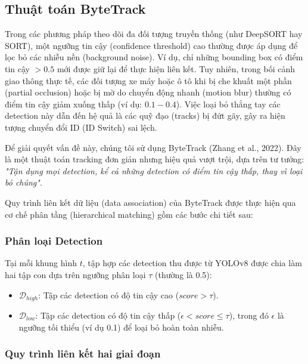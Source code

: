 \subsection{Thuật toán ByteTrack}
Trong các phương pháp theo dõi đa đối tượng truyền thống (như DeepSORT hay SORT), một ngưỡng tin cậy (confidence threshold) cao thường được áp dụng để lọc bỏ các nhiễu nền (background noise). Ví dụ, chỉ những bounding box có điểm tin cậy $> 0.5$ mới được giữ lại để thực hiện liên kết. Tuy nhiên, trong bối cảnh giao thông thực tế, các đối tượng xe máy hoặc ô tô khi bị che khuất một phần (partial occlusion) hoặc bị mờ do chuyển động nhanh (motion blur) thường có điểm tin cậy giảm xuống thấp (ví dụ: $0.1 - 0.4$). Việc loại bỏ thẳng tay các detection này dẫn đến hệ quả là các quỹ đạo (tracks) bị đứt gãy, gây ra hiện tượng chuyển đổi ID (ID Switch) sai lệch.

Để giải quyết vấn đề này, chúng tôi sử dụng ByteTrack (Zhang et al., 2022). Đây là một thuật toán tracking đơn giản nhưng hiệu quả vượt trội, dựa trên tư tưởng: \textit{"Tận dụng mọi detection, kể cả những detection có điểm tin cậy thấp, thay vì loại bỏ chúng"}.

Quy trình liên kết dữ liệu (data association) của ByteTrack được thực hiện qua cơ chế phân tầng (hierarchical matching) gồm các bước chi tiết sau:

\subsubsection{Phân loại Detection}
Tại mỗi khung hình $t$, tập hợp các detection thu được từ YOLOv8 được chia làm hai tập con dựa trên ngưỡng phân loại $\tau$ (thường là 0.5):
\begin{itemize}
    \item $\mathcal{D}_{high}$: Tập các detection có độ tin cậy cao ($score > \tau$).
    \item $\mathcal{D}_{low}$: Tập các detection có độ tin cậy thấp ($\epsilon < score \le \tau$), trong đó $\epsilon$ là ngưỡng tối thiểu (ví dụ 0.1) để loại bỏ hoàn toàn nhiễu.
\end{itemize}

\subsubsection{Quy trình liên kết hai giai đoạn}


